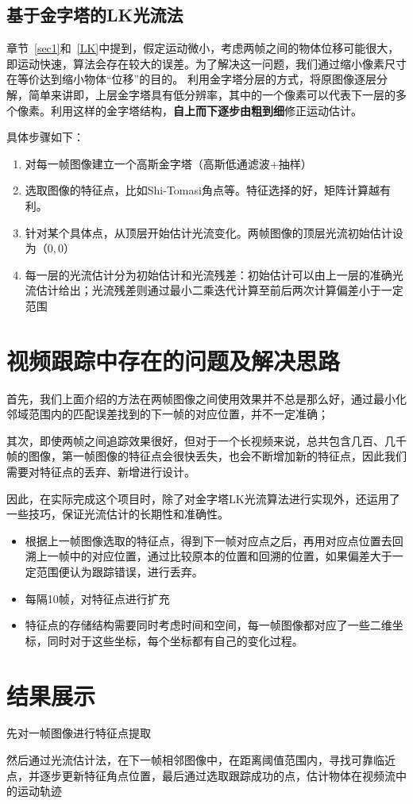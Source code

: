 \documentclass[UTF8]{ctexart}
\begin{document}
\begin{CJK*}{UTF8}{gbsn}
\subsection{基于金字塔的LK光流法}
章节~\ref{sec1}和~\ref{LK}中提到，假定运动微小，考虑两帧之间的物体位移可能很大，即运动快速，算法会存在较大的误差。为了解决这一问题，我们通过缩小像素尺寸在等价达到缩小物体“位移”的目的。
利用金字塔分层的方式，将原图像逐层分解，简单来讲即，上层金字塔具有低分辨率，其中的一个像素可以代表下一层的多个像素。利用这样的金字塔结构，\textbf{自上而下逐步由粗到细}修正运动估计。

具体步骤如下：
\begin{enumerate}
    \item 对每一帧图像建立一个高斯金字塔（高斯低通滤波+抽样）
    \item 选取图像的特征点，比如Shi-Tomasi角点等。特征选择的好，矩阵计算越有利。
    \item 针对某个具体点，从顶层开始估计光流变化。两帧图像的顶层光流初始估计设为$（0,0）$
    \item 每一层的光流估计分为初始估计和光流残差：初始估计可以由上一层的准确光流估计给出；光流残差则通过最小二乘迭代计算至前后两次计算偏差小于一定范围
\end{enumerate}
\section{视频跟踪中存在的问题及解决思路}

首先，我们上面介绍的方法在两帧图像之间使用效果并不总是那么好，通过最小化邻域范围内的匹配误差找到的下一帧的对应位置，并不一定准确；

其次，即使两帧之间追踪效果很好，但对于一个长视频来说，总共包含几百、几千帧的图像，第一帧图像的特征点会很快丢失，也会不断增加新的特征点，因此我们需要对特征点的丢弃、新增进行设计。

因此，在实际完成这个项目时，除了对金字塔LK光流算法进行实现外，还运用了一些技巧，保证光流估计的长期性和准确性。
\begin{itemize}
    \item 根据上一帧图像选取的特征点，得到下一帧对应点之后，再用对应点位置去回溯上一帧中的对应位置，通过比较原本的位置和回溯的位置，如果偏差大于一定范围便认为跟踪错误，进行丢弃。
    \item 每隔10帧，对特征点进行扩充
    \item 特征点的存储结构需要同时考虑时间和空间，每一帧图像都对应了一些二维坐标，同时对于这些坐标，每个坐标都有自己的变化过程。
\end{itemize}

\section{结果展示}
先对一帧图像进行特征点提取

然后通过光流估计法，在下一帧相邻图像中，在距离阈值范围内，寻找可靠临近点，并逐步更新特征角点位置，最后通过选取跟踪成功的点，估计物体在视频流中的运动轨迹


\end{CJK*}
\end{document}

